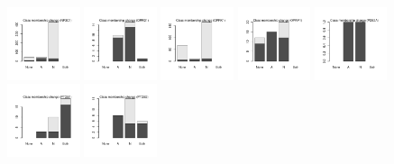 \documentclass[utf8]{frontiersSCNS} %
\begin{document}
\begin{figure}[h!]
\includegraphics[width=0.19\textwidth]{figures/validation_plots/nr3c1_0p9_valplot.pdf}
\includegraphics[width=0.19\textwidth]{figures/validation_plots/oprd1_0p9_valplot.pdf}
\includegraphics[width=0.19\textwidth]{figures/validation_plots/oprk1_0p9_valplot.pdf}
\includegraphics[width=0.19\textwidth]{figures/validation_plots/oprm1_0p9_valplot.pdf}
\includegraphics[width=0.19\textwidth]{figures/validation_plots/pde3a_0p9_valplot.pdf}
\includegraphics[width=0.19\textwidth]{figures/validation_plots/ptgs1_0p9_valplot.pdf}
\includegraphics[width=0.19\textwidth]{figures/validation_plots/ptgs2_0p9_valplot.pdf}

\end{figure}
\end{document}
